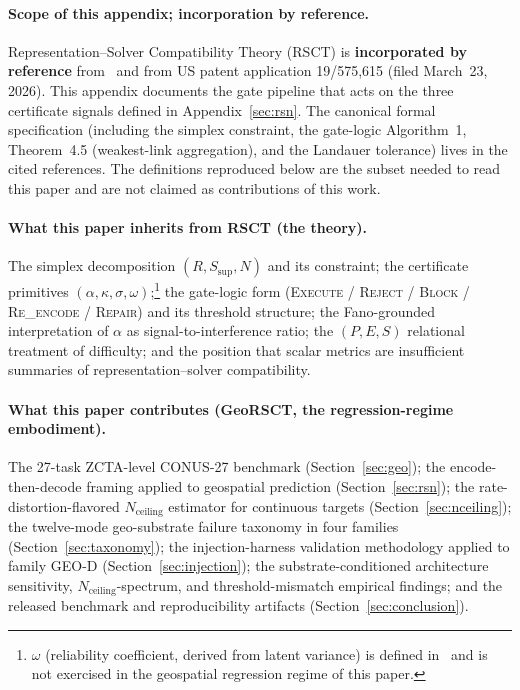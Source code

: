 \documentclass{article}
\begin{document}
\paragraph{Scope of this appendix; incorporation by reference.}
Representation--Solver Compatibility Theory (RSCT) is \textbf{incorporated by reference} from~\citep{martin2026rsct} and from US patent application 19/575{,}615 (filed March~23, 2026). This appendix documents the gate pipeline that acts on the three certificate signals defined in Appendix~\ref{sec:rsn}. The canonical formal specification (including the simplex constraint, the gate-logic Algorithm~1, Theorem~4.5 (weakest-link aggregation), and the Landauer tolerance) lives in the cited references. The definitions reproduced below are the subset needed to read this paper and are not claimed as contributions of this work.

\paragraph{What this paper inherits from RSCT (the theory).}
The simplex decomposition $(R, S_{\text{sup}}, N)$ and its constraint; the certificate primitives $(\alpha, \kappa, \sigma, \omega)$;\footnote{$\omega$ (reliability coefficient, derived from latent variance) is defined in~\citep{martin2026rsct} and is not exercised in the geospatial regression regime of this paper.} the gate-logic form (\textsc{Execute} / \textsc{Reject} / \textsc{Block} / \textsc{Re\_encode} / \textsc{Repair}) and its threshold structure; the Fano-grounded interpretation of $\alpha$ as signal-to-interference ratio; the $(P, E, S)$ relational treatment of difficulty; and the position that scalar metrics are insufficient summaries of representation--solver compatibility.

\paragraph{What this paper contributes (GeoRSCT, the regression-regime embodiment).}
The 27-task ZCTA-level CONUS-27 benchmark (Section~\ref{sec:geo}); the encode-then-decode framing applied to geospatial prediction (Section~\ref{sec:rsn}); the rate-distortion-flavored $N_{\text{ceiling}}$ estimator for continuous targets (Section~\ref{sec:nceiling}); the twelve-mode geo-substrate failure taxonomy in four families (Section~\ref{sec:taxonomy}); the injection-harness validation methodology applied to family GEO-D (Section~\ref{sec:injection}); the substrate-conditioned architecture sensitivity, $N_{\text{ceiling}}$-spectrum, and threshold-mismatch empirical findings; and the released benchmark and reproducibility artifacts (Section~\ref{sec:conclusion}).
\end{document}

